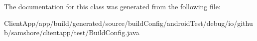 The documentation for this class was generated from the following file\+:\begin{DoxyCompactItemize}
\item 
Client\+App/app/build/generated/source/build\+Config/android\+Test/debug/io/github/samshore/clientapp/test/Build\+Config.\+java\end{DoxyCompactItemize}
